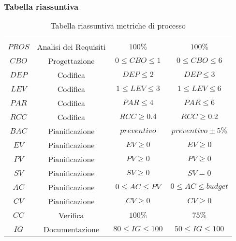 \subsubsection{Tabella riassuntiva}
\begin{table}[H]
	\begin{center}
		\caption{Tabella riassuntiva metriche di processo}
		\begin{tabular}{cc!{\color[HTML]{9b240a}\vrule width 0.05cm}cc}
			\rowcolorhead
			 &  &  &  \\

			$PROS$               & Analisi dei Requisiti       & $100\%$                          & $100\% $                           \\
			$CBO$                & Progettazione               & $0\leq CBO\leq 1$                & $0 \leq CBO \leq 6$                    \\
			$DEP$                & Codifica                    & $DEP\leq 2$                      & $DEP \leq 3     $                    \\
			$LEV$                & Codifica                    & $1\leq LEV \leq 3$               & $1\leq LEV \leq 6$                    \\
			$PAR$                & Codifica                    & $PAR\leq 4$                      & $PAR\leq6     $                    \\
			$RCC$                & Codifica                    & $RCC \geq 0.4$                   & $RCC\geq0.2   $                    \\
			$BAC$                & Pianificazione              & $preventivo$                     & $preventivo \pm 5\%$      \\
			$EV$                 & Pianificazione              & $EV \geq 0$                      & $EV\geq0$                          \\
			$PV$                 & Pianificazione              & $PV \geq0$                       & $PV\geq0$                          \\
			$SV$                 & Pianificazione              & $SV \geq 0$                      & $SV=0   $                          \\
			$AC$                 & Pianificazione              & $0 \leq AC \leq PV$              & $0 \leq AC\leq budget$       \\
			$CV$                 & Pianificazione              & $CV \geq 0 $                     & $CV\geq 0$                          \\
			$CC$                 & Verifica                    & $100\% $                         & $75\%    $                         \\
			$IG$                 & Documentazione              & $80\leq IG \leq 100$             & $50\leq IG \leq 100$                  \\
		\end{tabular}

	\end{center}
\end{table}